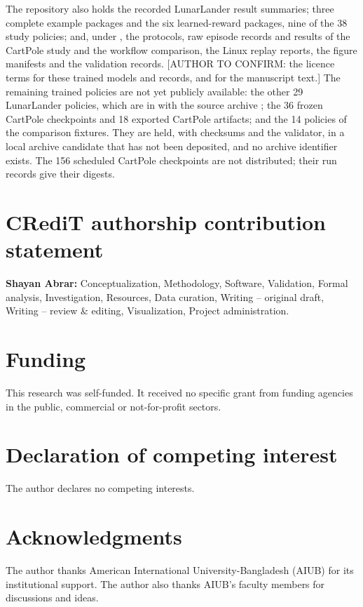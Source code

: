 \documentclass[preprint,12pt]{elsarticle}
\begin{document}
The repository also holds the recorded LunarLander result summaries; three complete example packages and the six learned-reward packages, nine of the 38 study policies; and, under , the protocols, raw episode records and results of the CartPole study and the workflow comparison, the Linux replay reports, the figure manifests and the validation records. [AUTHOR TO CONFIRM: the licence terms for these trained models and records, and for the manuscript text.] The remaining trained policies are not yet publicly available: the other 29 LunarLander policies, which are in  with the source archive ; the 36 frozen CartPole checkpoints and 18 exported CartPole artifacts; and the 14 policies of the comparison fixtures. They are held, with checksums and the validator, in a local archive candidate that has not been deposited, and no archive identifier exists. The 156 scheduled CartPole checkpoints are not distributed; their run records give their digests.

\section*{CRediT authorship contribution statement}
\textbf{Shayan Abrar:} Conceptualization, Methodology, Software, Validation, Formal analysis, Investigation, Resources, Data curation, Writing -- original draft, Writing -- review \& editing, Visualization, Project administration.

\section*{Funding}
This research was self-funded. It received no specific grant from funding agencies in the public, commercial or not-for-profit sectors.

\section*{Declaration of competing interest}
The author declares no competing interests.

\section*{Acknowledgments}
The author thanks American International University-Bangladesh (AIUB) for its institutional support. The author also thanks AIUB's faculty members for discussions and ideas.
\end{document}
